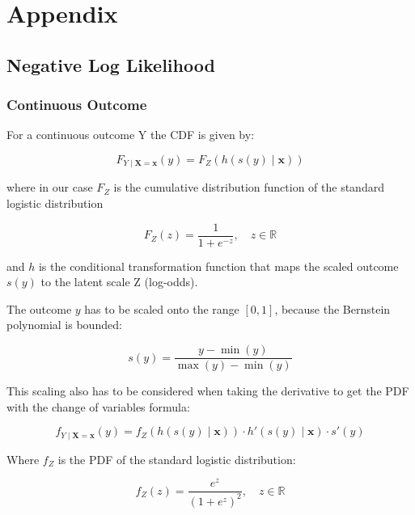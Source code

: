 



\chapter{Appendix}



\section{Negative Log Likelihood}


\subsection{Continuous Outcome}

For a continuous outcome Y the CDF is given by:

\begin{equation}
F_{Y \mid \mathbf{X} = \mathbf{x}}(y) = F_Z(h(s(y) \mid \mathbf{x}))
\end{equation}

where in our case \( F_Z \) is the cumulative distribution function of the standard logistic distribution

\begin{equation}
F_Z(z) = \frac{1}{1 + e^{-z}}, \quad z \in \mathbb{R}
\end{equation}

and \( h \) is the conditional transformation function that maps the scaled outcome \( s(y) \) to the latent scale Z (log-odds).

The outcome $y$ has to be scaled onto the range $[0, 1]$, because the Bernstein polynomial is bounded:

\begin{equation}
s(y) = \frac{y - \min(y)}{\max(y) - \min(y)}
\end{equation}

This scaling also has to be considered when taking the derivative to get the PDF with the change of variables formula:

\begin{equation}
f_{Y \mid \mathbf{X} = \mathbf{x}}(y) = f_Z(h(s(y) \mid \mathbf{x})) \cdot h'(s(y) \mid \mathbf{x}) \cdot s'(y)
\end{equation}

Where $f_Z$ is the PDF of the standard logistic distribution:

\begin{equation}
f_Z(z) = \frac{e^{z}}{(1 + e^{z})^2}, \quad z \in \mathbb{R}
\end{equation}

